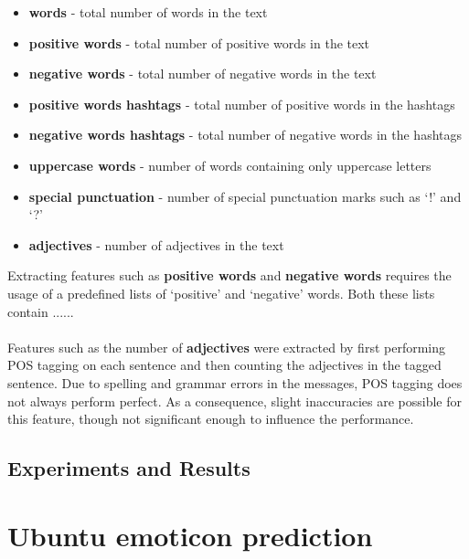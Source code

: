 \documentclass{article}
\begin{document}
\begin{itemize}
\item \textbf{words} - total number of words in the text
\item \textbf{positive words} - total number of positive words in the text
\item \textbf{negative words} - total number of negative words in the text
\item \textbf{positive words hashtags} - total number of positive words in the hashtags
\item \textbf{negative words hashtags} - total number of negative words in the hashtags
\item \textbf{uppercase words} - number of words containing only uppercase letters
\item \textbf{special punctuation} - number of special punctuation marks such as `!' and `?'
\item \textbf{adjectives} - number of adjectives in the text 
\end{itemize}

\noindent Extracting features such as \textbf{positive words} and \textbf{negative words} requires the usage of a predefined lists of `positive' and `negative' words. Both these lists contain ...... %
\\
\\
Features such as the number of \textbf{adjectives} were extracted by first performing POS tagging on each sentence and then counting the adjectives in the tagged sentence. Due to spelling and grammar errors in the messages, POS tagging does not always perform  perfect. As a consequence, slight inaccuracies are possible for this feature, though not significant enough to influence the performance.



\subsection{Experiments and Results}

\pagebreak



\section{Ubuntu emoticon prediction}
\end{document}
